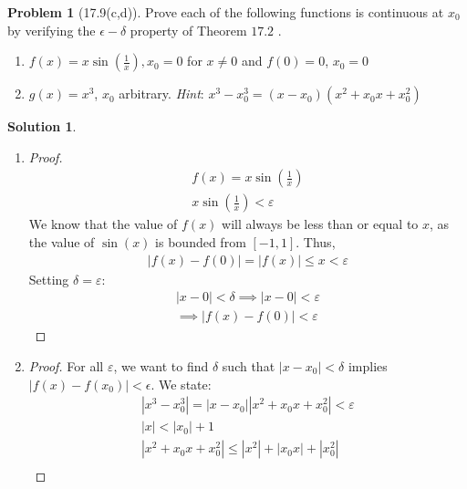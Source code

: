 \documentclass[12pt]{article}
\theoremstyle{definition} %
\newtheorem{solution}{Solution}
\newtheorem{problem}{Problem}
\theoremstyle{plain} %
\begin{document}
\begin{problem}[17.9(c,d)]
   Prove each of the following functions is continuous at $x_{0}$ by verifying
the $\epsilon-\delta$ property of Theorem $17.2$ .
   \begin{enumerate}
   \item $f(x)=x\sin \left( \frac{1}{x} \right) ,x_{0} =0$ for $x\neq 0$ and $f(0)=0$, $x_{0}=0 $
   \item $g(x)=x^{3} $, $x_{0}   $ arbitrary. \emph{Hint}: $x^{3} -x^{3}_{0}=(x-x_{0} )(x^{2}+x_{0}x+x_{0}^{2}) $ 

   \end{enumerate} 
\end{problem}
\begin{solution}
   \begin{enumerate}
    \item \begin{proof}
      \begin{align}
        f(x)=x\sin \left(  \frac{1}{x}\right)\\[10pt] 
        x\sin \left( \frac{1}{x} \right) <\varepsilon
      \end{align}
      We know that the value of $f(x)$ will always be less than or equal to $x$, as the value of $\sin(x)$ is bounded from $[-1,1]$. Thus,
      \begin{align}
         \left\vert f(x)-f(0) \right\vert =\left\vert f({x}) \right\vert \leq x<\varepsilon
      \end{align}
      Setting $\delta =\varepsilon$:
      \begin{align}
         \left\vert x-0 \right\vert <\delta \implies \left\vert x- 0 \right\vert < \varepsilon \\[10pt] 
         \implies \left\vert f(x)-f(0) \right\vert < \varepsilon
      \end{align}
    \end{proof}
  \item \begin{proof}
  For all $\varepsilon$, we want to find $\delta$ such that $\left\vert x-x_0 \right\vert <\delta $ implies $\left\vert f(x)-f(x_0) \right\vert <\epsilon$. We state: 
      \begin{align}
        \left\vert x^{3}-x_0^{3} \right\vert =\left\vert x-x_0 \right\vert \left\vert x^{2}+x_{0}x+x_{0}^{2}  \right\vert <\varepsilon \\[10pt] 
        \left\vert x \right\vert <\left\vert x_0 \right\vert +1 \\[10pt] 
        \left\vert x^{2}+x_{0}x+x_{0}^{2}  \right\vert \leq \left\vert x^{2} \right\vert +\left\vert x_{0}x  \right\vert +\left\vert x_{0}^{2} \right\vert \\[10pt] 

\end{align}
\end{proof}
\end{enumerate}
\end{solution}
\end{document}
